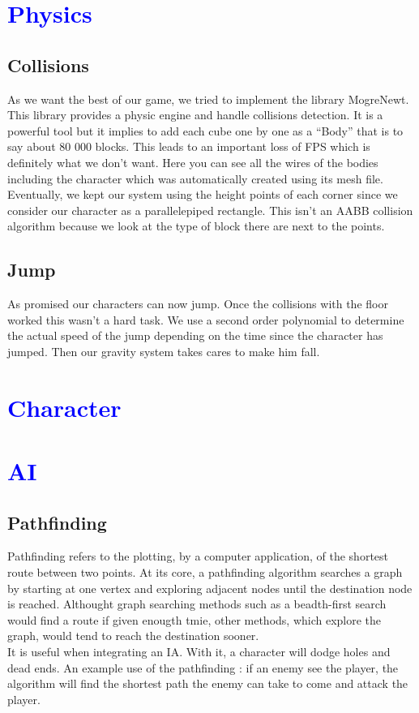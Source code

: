 \documentclass[article]{report}             %
\begin{document}
		\chapter{\textcolor{blue}{Physics}}
			\section{Collisions}
				As we want the best of our game, we tried to implement the library MogreNewt. This library provides a physic engine and handle collisions detection. It is a powerful tool but it implies to add each cube one by one as a \enquote{Body} that is to say about 80 000 blocks. This leads to an important loss of FPS which is definitely what we don't want. Here you can see all the wires of the bodies including the character which was automatically created using its mesh file.\\

Eventually, we kept our system using the height points of each corner since we consider our character as a parallelepiped rectangle. This isn't an AABB collision algorithm because we look at the type of block there are next to the points.

			\section{Jump}
				As promised our characters can now jump. Once the collisions with the floor worked this wasn't a hard task. We use a second order polynomial to determine the actual speed of the jump depending on the time since the character has jumped. Then our gravity system takes cares to make him fall.
				
		\chapter{\textcolor{blue}{Character}}

		\chapter{\textcolor{blue}{AI}}
			\section{Pathfinding}
				Pathfinding refers to the plotting, by a computer application, of the shortest route between two points. At its core, a pathfinding algorithm searches a graph by starting at one vertex and exploring adjacent nodes until the destination node is reached. Althought graph searching methods such as a beadth-first search would find a route if given enougth tmie, other methods, which explore the graph, would tend to reach the destination sooner. \\
 It is useful when integrating an IA. With it, a character will dodge holes and dead ends. An example use of the pathfinding : if an enemy see the player, the algorithm will find the shortest path the enemy can take to come and attack the player.
\end{document}
